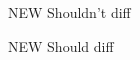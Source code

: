 \documentclass{article}
\newcommand{\cmd}[2]{#1 \par #2}
\begin{document}
\cmd{NEW Shouldn't diff}{NEW Should diff}
\end{document}
